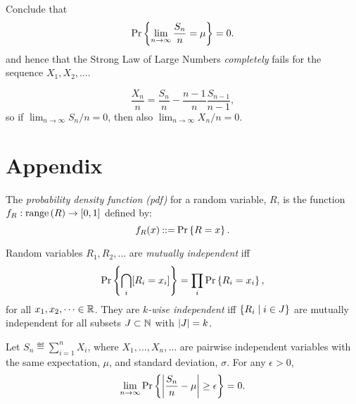 \documentclass[11pt]{article}
\begin{document}
\begin{problem}
\begin{problemparts}
\problempart
Conclude that
\begin{equation}\label{sm0}
\mathop{\textup{Pr}}\nolimits\left\{\lim_{n \to \infty} \frac{S_n}{n} = \mu\right\} = 0.
\end{equation}
and hence that the Strong Law of Large Numbers \emph{completely} fails for
the sequence $X_1,X_2,\dots$.

\hint
\[
\frac{X_n}{n} = \frac{S_n}{n} - \frac{n-1}{n}\frac{S_{n-1}}{n-1},
\]
so if $\lim_{n \to \infty} S_n/n = 0$, then also $\lim_{n \to \infty}
X_n/n = 0$.


\end{problemparts}
\end{problem}

\appendix

\section{Appendix}
\setcounter{secnumdepth}{0}

The \emph{probability density function (pdf)} for a random variable, $R$, is
the function $f_R : \mathop{\textup{range}}\nolimits\left(R\right) \to [0,1]$ defined by:
\[
f_R(x) \mathbin{::=} \mathop{\textup{Pr}}\nolimits\left\{R = x\right\}.
\]

Random variables $R_1, R_2, \dots$ are \emph{mutually independent} iff
\[
\mathop{\textup{Pr}}\nolimits\left\{\bigcap_{i} [R_i = x_i]\right\} = \prod_{i} \mathop{\textup{Pr}}\nolimits\left\{R_i = x_i\right\},
\]
for all $x_1, x_2, \dots \in \mathbb{R}$.  They are \emph{$k$-wise
independent} iff $\left\{R_i \mid i\in J\right\}$ are mutually independent for
all subsets $J \subset \mathbb{N}$ with $\left|J\right| = k$.

\begin{theorem*}
Let $S_n \eqdef \sum_{i=1}^n X_i$, where $X_1, \dots, X_n, \dots$ are
pairwise independent variables with the same expectation, $\mu$, and
standard deviation, $\sigma$.  For any $\epsilon > 0$,
\[
\lim_{n \rightarrow \infty} \mathop{\textup{Pr}}\nolimits\left\{\left|\frac{S_n}{n} - \mu\right| \geq \epsilon\right\} = 0.
\]
\end{theorem*}
\end{document}
